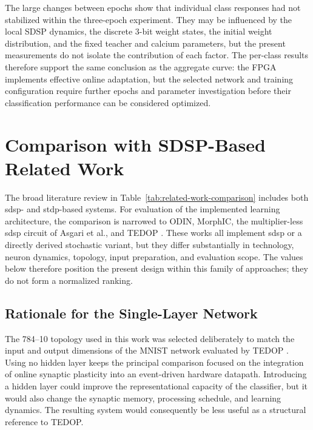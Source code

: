 The large changes between epochs show that individual class responses had not stabilized within the three-epoch experiment. They may be influenced by the local SDSP dynamics, the discrete 3-bit weight states, the initial weight distribution, and the fixed teacher and calcium parameters, but the present measurements do not isolate the contribution of each factor. The per-class results therefore support the same conclusion as the aggregate curve: the FPGA implements effective online adaptation, but the selected network and training configuration require further epochs and parameter investigation before their classification performance can be considered optimized.

\section{Comparison with SDSP-Based Related Work}
\label{subsec:comparison-with-related-work}

The broad literature review in Table~\ref{tab:related-work-comparison} includes both \gls{sdsp}- and \gls{stdp}-based systems. For evaluation of the implemented learning architecture, the comparison is narrowed to ODIN, MorphIC, the multiplier-less \gls{sdsp} circuit of Asgari et al., and TEDOP \cite{Frenkel2019ODIN,Frenkel2019MorphIC,Asgari2020SDSP,Shi2022TEDOP}. These works all implement \gls{sdsp} or a directly derived stochastic variant, but they differ substantially in technology, neuron dynamics, topology, input preparation, and evaluation scope. The values below therefore position the present design within this family of approaches; they do not form a normalized ranking.

\subsection{Rationale for the Single-Layer Network}

The 784--10 topology used in this work was selected deliberately to match the input and output dimensions of the MNIST network evaluated by TEDOP \cite{Shi2022TEDOP}. Using no hidden layer keeps the principal comparison focused on the integration of online synaptic plasticity into an event-driven hardware datapath. Introducing a hidden layer could improve the representational capacity of the classifier, but it would also change the synaptic memory, processing schedule, and learning dynamics. The resulting system would consequently be less useful as a structural reference to TEDOP.

